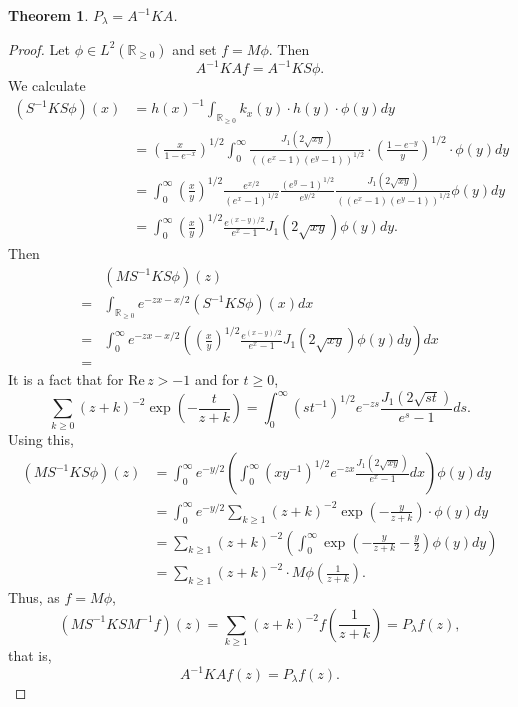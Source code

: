 \documentclass{article}
\def\Re{\ensuremath{\mathrm{Re}}\,}
\newtheorem{theorem}{Theorem}
\theoremstyle{definition}
\begin{document}
\begin{theorem}
$P_\lambda = A^{-1}KA$.
\end{theorem}
\begin{proof}
Let $\phi \in L^2(\mathbb{R}_{\geq 0})$ and set $f=M\phi$. Then
\[
A^{-1}KAf = A^{-1}KS\phi.
\]
We calculate
\begin{align*}
(S^{-1}KS\phi)(x)&=h(x)^{-1} \int_{\mathbb{R}_{\geq 0}} k_x(y) \cdot h(y) \cdot \phi(y) dy\\
&=\left(\frac{x}{1-e^{-x}} \right)^{1/2}
\int_0^\infty 
 \frac{J_1(2 \sqrt{xy})}{((e^x-1)(e^y-1))^{1/2}}
 \cdot \left(\frac{1-e^{-y}}{y} \right)^{1/2}
 \cdot \phi(y) dy\\
 &=\int_0^\infty \left( \frac{x}{y} \right)^{1/2} \frac{e^{x/2}}{(e^x-1)^{1/2}} \frac{(e^y-1)^{1/2}}{e^{y/2}}  \frac{J_1(2 \sqrt{xy})}{((e^x-1)(e^y-1))^{1/2}}
 \phi(y) dy\\
 &=\int_0^\infty  \left( \frac{x}{y} \right)^{1/2} \frac{e^{(x-y)/2}}{e^x-1} J_1(2 \sqrt{xy})\phi(y) dy.
\end{align*}
Then
\[
\begin{split}
&(MS^{-1}KS\phi)(z)\\
=&\int_{\mathbb{R}_{\geq 0}} e^{-zx -x/2} (S^{-1}KS\phi)(x) dx\\
=&\int_0^\infty e^{-zx-x/2} \left(  \left( \frac{x}{y} \right)^{1/2} \frac{e^{(x-y)/2}}{e^x-1} J_1(2 \sqrt{xy})\phi(y) dy \right) dx\\
=&
\end{split}
\]
It is a fact that for $\Re z>-1$ and for $t \geq 0$,
\[
\sum_{k \geq 0} (z+k)^{-2} \exp\left(-\frac{t}{z+k} \right) = \int_0^\infty (s t^{-1})^{1/2} e^{-zs} \frac{J_1(2\sqrt{st})}{e^s-1} ds.
\]
Using this,
\begin{align*}
(MS^{-1}KS\phi)(z)&=\int_0^\infty e^{-y/2} \left( \int_0^\infty  (xy^{-1})^{1/2}  e^{-zx} \frac{J_1(2\sqrt{xy})}{e^x-1} dx\right) \phi(y) dy\\
&=\int_0^\infty e^{-y/2} \sum_{k \geq 1} (z+k)^{-2} \exp\left(-\frac{y}{z+k} \right) \cdot \phi(y) dy\\
&=\sum_{k \geq 1} (z+k)^{-2} \left( \int_0^\infty  \exp\left(-\frac{y}{z+k}-\frac{y}{2} \right)  \phi(y) dy\right)\\
&=\sum_{k \geq 1} (z+k)^{-2} \cdot M\phi\left(\frac{1}{z+k}\right).
\end{align*}
Thus, as $f=M\phi$,
\[
(MS^{-1}KSM^{-1}f)(z) = \sum_{k \geq 1} (z+k)^{-2} f\left(\frac{1}{z+k}\right) = P_\lambda f(z),
\]
that is,
\[
A^{-1}KAf(z) = P_\lambda f(z).
\]

\end{proof}
\end{document}
